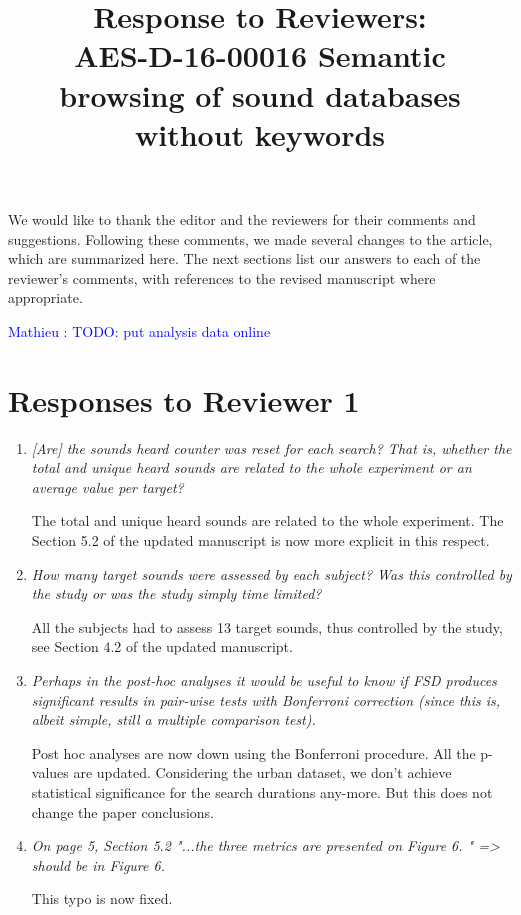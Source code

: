 \documentclass[10pt]{article}
\title{Response to Reviewers: \\ AES-D-16-00016
Semantic browsing of sound databases without keywords}
\newcommand{\ml}[1]{\textcolor{blue}{ Mathieu : #1}}
\begin{document}
\maketitle

We would like to thank the editor and the reviewers for their comments and suggestions. Following these comments, we made several changes to the article, which are summarized here. The next sections list our answers to each of the reviewer’s comments, with references to the revised manuscript where appropriate.

\ml{TODO: put analysis data online}

\section{Responses to Reviewer 1}

\begin{enumerate}

\item \emph{[Are] the sounds heard counter was reset for each search? That is, whether the total and unique heard sounds are related to the whole experiment or an average value per target?}

The total and unique heard sounds are related to the whole experiment. The Section 5.2 of the updated manuscript is now more explicit in this respect.

\item \emph{How many target sounds were assessed by each subject? Was this controlled by the study or was the study simply time limited?}

All the subjects had to assess 13 target sounds, thus controlled by the study, see Section 4.2 of the updated manuscript.

\item \emph{Perhaps in the post-hoc analyses it would be useful to know if FSD produces significant results in pair-wise tests with Bonferroni correction (since this is, albeit simple, still a multiple comparison test).}

Post hoc analyses are now down using the Bonferroni procedure. All the p-values are updated. Considering the urban dataset, we don't achieve statistical significance for the search durations any-more. But this does not change the paper conclusions.

\item \emph{On page 5, Section 5.2  "...the three metrics are presented on Figure 6. " => should be in Figure 6.}

This typo is now fixed.

\end{enumerate}
\end{document}

